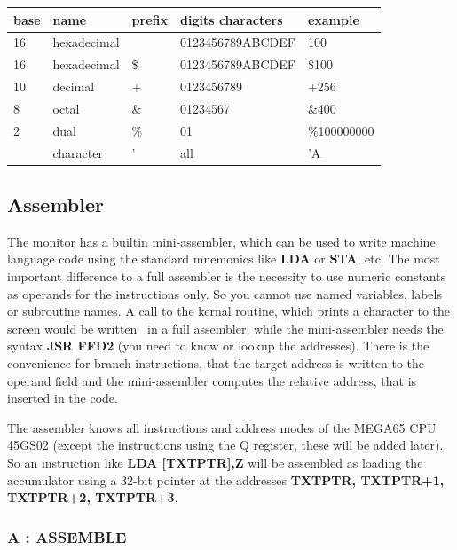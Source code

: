 {\ttfamily
{\setlength{\tabcolsep}{1mm}
\begin{center}
\begin{tabular}{|l|l|l|l|l|}
\hline
 base  & name & prefix & digits characters & example     \\
\hline
16 & hexadecimal  &     & 0123456789ABCDEF &   100       \\
16 & hexadecimal  & \$  & 0123456789ABCDEF & \$100       \\
10 & decimal      &  +  & 0123456789       & +256        \\
 8 & octal        & \&  & 01234567         & \&400       \\
 2 & dual         & \%  & 01               & \%100000000 \\
   & character    &  '  & all              & 'A          \\
\hline
\end{tabular}
\end{center}
}
}

\subsection{Assembler}

The monitor has a builtin mini-assembler, which can be used to write
machine language code using the standard mnemonics like {\bf LDA} or
{\bf STA}, etc.
The most important difference to a full assembler is the necessity
to use numeric constants as operands for the instructions only.
So you cannot use named variables, labels or subroutine names.
A call to the kernal routine, which prints a character to the screen
would be written {} in a full assembler, while
the mini-assembler needs the syntax {\ttfamily \bf JSR FFD2} (you need
to know or lookup the addresses). There is the convenience for
branch instructions, that the target address is written to the
operand field and the mini-assembler computes the relative address,
that is inserted in the code.

The assembler knows all instructions and address modes of the MEGA65
CPU 45GS02 (except the instructions using the Q register, these will
be added later). So an instruction like {\ttfamily \bf LDA [TXTPTR],Z}
will be assembled as loading the accumulator using a 32-bit pointer
at the addresses {\ttfamily \bf TXTPTR, TXTPTR+1, TXTPTR+2, TXTPTR+3}.


\subsubsection{A : ASSEMBLE}

